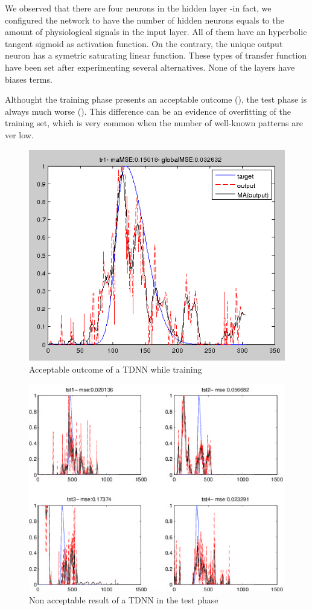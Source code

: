 We observed that there are four neurons in the hidden layer -in fact, we configured the network to have the number of hidden neurons equals to the amount of physiological signals in the input layer. All of them have an hyperbolic tangent sigmoid as activation function. On the contrary, the unique output neuron has a symetric saturating linear function. These types of transfer function have been set after experimenting several alternatives. None of the layers have biases terms.

Althought the training phase presents an acceptable outcome (), the test phase is always much worse (). This difference can be an evidence of overfitting of the training set, which is very common when the number of well-known patterns are ver low.

\begin{figure}[!ht]
\centering
\includegraphics[width=0.7\columnwidth]{images/results/tdnnTraining}
\caption{Acceptable outcome of a TDNN while training}
\label{fig:tdnntraining}
\end{figure}

\begin{figure}[!ht]
\centering
\includegraphics[width=0.9\columnwidth]{images/results/tdnnTest}
\caption{Non acceptable result of a TDNN in the test phase}
\label{fig:tdnntest}
\end{figure}

